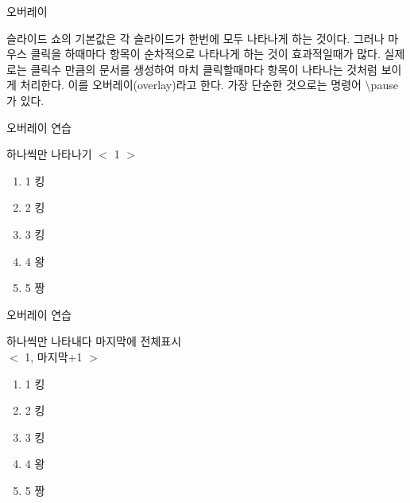 \documentclass[10pt,blue,xcolor=pdftex,dvipsnames,table,handout]{beamer}
\begin{document}
		\begin{frame}[plain]
		\end{frame}

		\begin{frame}[t]{오버레이}

		슬라이드 쇼의 기본값은 각 슬라이드가 한번에 모두 나타나게 하는 것이다.
		그러나 마우스 클릭을 하때마다 항목이 순차적으로 나타나게 하는 것이 효과적일때가 많다.
		실제로는 클릭수 만큼의 문서를 생성하여 마치 클릭할때마다 항목이 나타나는 것처럼 보이게 처리한다. 
		이를 오버레이(overlay)라고 한다. 가장 단순한 것으로는 명령어 \textbackslash pause가 있다.


		\end{frame}

		\begin{frame}[t]{오버레이 연습}

			\begin{block} {하나씩만 나타나기 $<$ 1 $>$ }
			\begin{enumerate}
			\item <1> 1 킹
			\item <2> 2 킹
			\item <3> 3 킹
			\item <4> 4 왕
			\item <5> 5 짱
			\end{enumerate}
			\end{block} 

		\end{frame}

		\begin{frame}[t]{오버레이 연습}

			\begin{block} {하나씩만 나타내다 마지막에 전체표시\\
						$<$ 1, 마지막+1 $>$ }
			\begin{enumerate}
			\item <1,6> 1 킹
			\item <2,6> 2 킹
			\item <3,6> 3 킹
			\item <4,6> 4 왕
			\item <5,6> 5 짱
			\end{enumerate}
			\end{block} 

		\end{frame}
\end{document}
